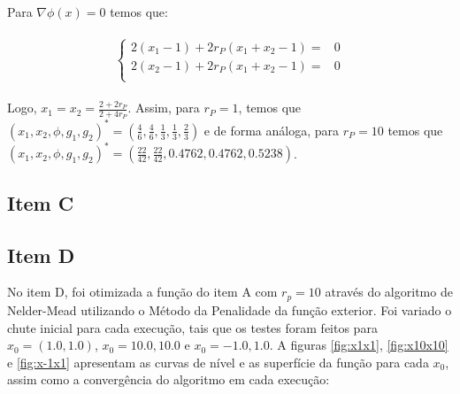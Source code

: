 \documentclass[a4paper, 12pt]{article}
\begin{document}
Para $\nabla \phi(x) = 0$ temos que:

\begin{align*}
\begin{split}
\left\{\begin{matrix}
2(x_1 - 1) + 2 r_P (x_1 + x_2- 1 ) = & 0 \\ 
2(x_2 - 1) + 2 r_P (x_1 + x_2- 1 ) = & 0 \\ 
\end{matrix}\right.
\end{split}
\end{align*}

Logo, $x_1 = x_2 = \frac{2 + 2 r_P}{2 + 4 r_P}$. Assim, para $r_P = 1$, temos que  $(x_1,x_2,\phi, g_1, g_2)^* = (\frac{4}{6}, \frac{4}{6}, \frac{1}{3}, \frac{1}{3}, \frac{2}{3})$ e de forma análoga, para $r_P = 10$ temos que \newline
$(x_1,x_2,\phi, g_1, g_2)^* = (\frac{22}{42},\frac{22}{42},0.4762,0.4762,0.5238)$.
\subsection*{Item C}

\subsection*{Item D}
No item D, foi otimizada a função do item A com $r_p = 10$ através do algoritmo de Nelder-Mead utilizando o Método da Penalidade da função exterior. Foi variado o chute inicial para cada execução, tais que os testes foram feitos para $x_0 = (1.0, 1.0)$, $x_0 = {10.0, 10.0}$ e $x_0 = {-1.0, 1.0}$.
A figuras \ref{fig:x1x1}, \ref{fig:x10x10} e \ref{fig:x-1x1} apresentam as curvas de nível e as superfície da função para cada $x_0$, assim como a convergência do algoritmo em cada execução:
\end{document}
